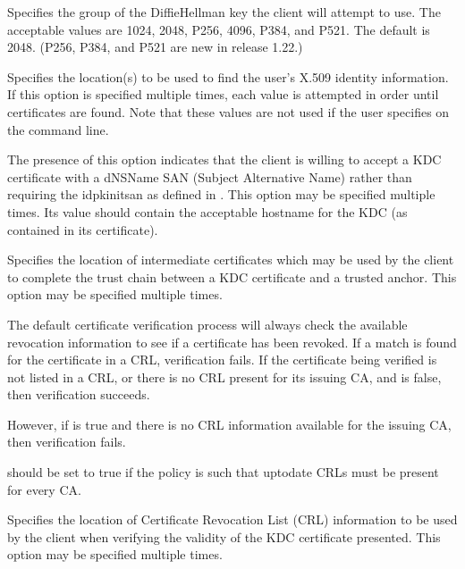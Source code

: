 \documentclass[letterpaper,10pt,english]{sphinxmanual}
\begin{document}
\begin{description}
\sphinxAtStartPar
Specifies the group of the Diffie\sphinxhyphen{}Hellman key the client will
attempt to use.  The acceptable values are 1024, 2048, P\sphinxhyphen{}256,
4096, P\sphinxhyphen{}384, and P\sphinxhyphen{}521.  The default is 2048.  (P\sphinxhyphen{}256, P\sphinxhyphen{}384, and
P\sphinxhyphen{}521 are new in release 1.22.)

\sphinxAtStartPar
Specifies the location(s) to be used to find the user’s X.509
identity information.  If this option is specified multiple times,
each value is attempted in order until certificates are found.
Note that these values are not used if the user specifies
 on the command line.

\sphinxAtStartPar
The presence of this option indicates that the client is willing
to accept a KDC certificate with a dNSName SAN (Subject
Alternative Name) rather than requiring the id\sphinxhyphen{}pkinit\sphinxhyphen{}san as
defined in .  This option may be specified multiple
times.  Its value should contain the acceptable hostname for the
KDC (as contained in its certificate).

\sphinxAtStartPar
Specifies the location of intermediate certificates which may be
used by the client to complete the trust chain between a KDC
certificate and a trusted anchor.  This option may be specified
multiple times.

\sphinxAtStartPar
The default certificate verification process will always check the
available revocation information to see if a certificate has been
revoked.  If a match is found for the certificate in a CRL,
verification fails.  If the certificate being verified is not
listed in a CRL, or there is no CRL present for its issuing CA,
and  is false, then verification
succeeds.

\sphinxAtStartPar
However, if  is true and there is
no CRL information available for the issuing CA, then verification
fails.

\sphinxAtStartPar
{} should be set to true if the
policy is such that up\sphinxhyphen{}to\sphinxhyphen{}date CRLs must be present for every CA.

\sphinxAtStartPar
Specifies the location of Certificate Revocation List (CRL)
information to be used by the client when verifying the validity
of the KDC certificate presented.  This option may be specified
multiple times.

\end{description}
\end{document}

